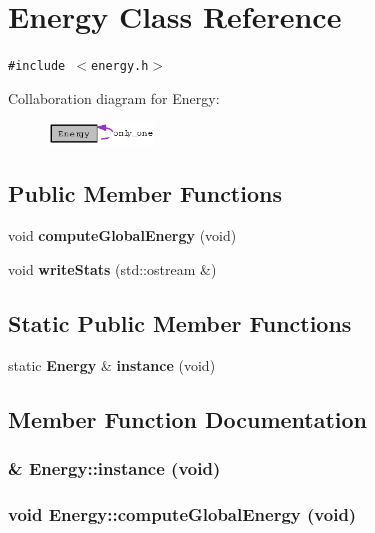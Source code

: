 \section{Energy Class Reference}
\label{classEnergy}
{\tt \#include $<$energy.h$>$}

Collaboration diagram for Energy:\begin{figure}[H]
\begin{center}
\leavevmode
\includegraphics[width=80pt]{classEnergy__coll__graph}
\end{center}
\end{figure}
\subsection*{Public Member Functions}
\begin{CompactItemize}
\item 
void {\bf compute\-Global\-Energy} (void)
\item 
void {\bf write\-Stats} (std::ostream \&)
\end{CompactItemize}
\subsection*{Static Public Member Functions}
\begin{CompactItemize}
\item 
static {\bf Energy} \& {\bf instance} (void)
\end{CompactItemize}


\subsection{Member Function Documentation}
\subsubsection{ \& Energy::instance (void)\hspace{0.3cm}{\tt  [static]}}\label{classEnergy_0507547be610702ae317b136fd05c31d}


\subsubsection{\setlength{\rightskip}{0pt plus 5cm}void Energy::compute\-Global\-Energy (void)}\label{classEnergy_fe2e06beeb8f6cadb07bfbd2f8a1d96e}


